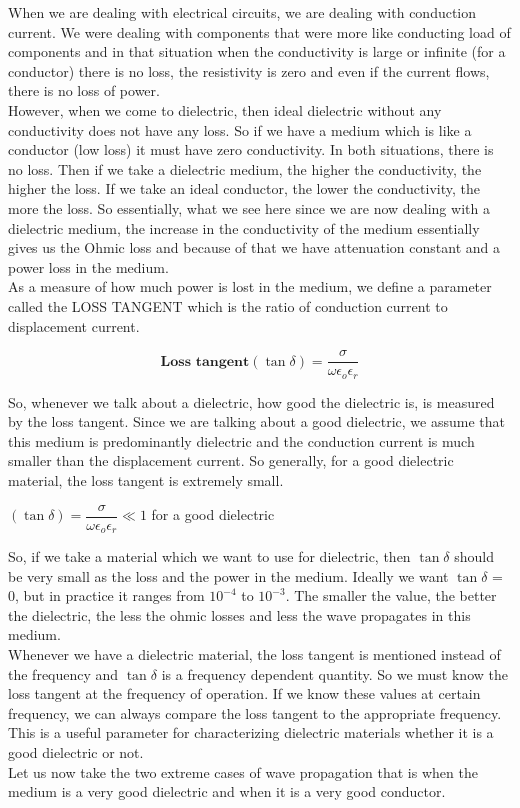 When we are dealing with electrical circuits, we are dealing with conduction current. We were dealing with components that were more like conducting load of components and in that situation when the conductivity is large or infinite (for a conductor) there is no loss, the resistivity is zero and even if the current flows, there is no loss of power.\\
However, when we come to dielectric, then ideal dielectric without any conductivity does not have any loss. So if we have a medium which is like a conductor (low loss) it must have zero conductivity. In both situations, there is no loss. Then if we take a dielectric medium, the higher the conductivity, the higher the loss. If we take an ideal conductor, the lower the conductivity, the more the loss. So essentially, what we see here since we are now dealing with a dielectric medium, the increase in the conductivity of the medium essentially gives us the Ohmic loss and because of that we have attenuation constant and a power loss in the medium.\\
As a measure of how much power is lost in the medium, we define a parameter called the LOSS TANGENT which is the ratio of conduction current to displacement current.

\begin{equation}
\textbf{Loss tangent}(\tan\delta) = \dfrac{\sigma}{\omega\epsilon_{o}\epsilon_{r}}
\end{equation}

So, whenever we talk about a dielectric, how good the dielectric is, is measured by the loss tangent. Since we are talking about a good dielectric, we assume that this medium is predominantly dielectric and the conduction current is much smaller than the displacement current. So generally, for a good dielectric material, the loss tangent is extremely small. 

\begin{center}
$(\tan\delta) = \dfrac{\sigma}{\omega\epsilon_{o}\epsilon_{r}} \ll 1$ for a good dielectric
\end{center}

So, if we take a material which we want to use for dielectric, then $\tan\delta$ should be very small as the loss and the power in the medium. Ideally we want $\tan\delta$ = 0, but in practice it ranges from $10^{-4}$ to $10^{-3}$. The smaller the value, the better the dielectric, the less the ohmic losses and less the wave propagates in this medium.\\ 
Whenever we have a dielectric material, the loss tangent is mentioned instead of the frequency and $\tan\delta$ is a frequency dependent quantity. So we must know the loss tangent at the frequency of operation. If we know these values at certain frequency, we can always compare the loss tangent to the appropriate frequency. This is a useful parameter for characterizing dielectric materials whether it is a good dielectric or not.\\ 
Let us now take the two extreme cases of wave propagation that is when the medium is a very good dielectric and when it is a very good conductor.

